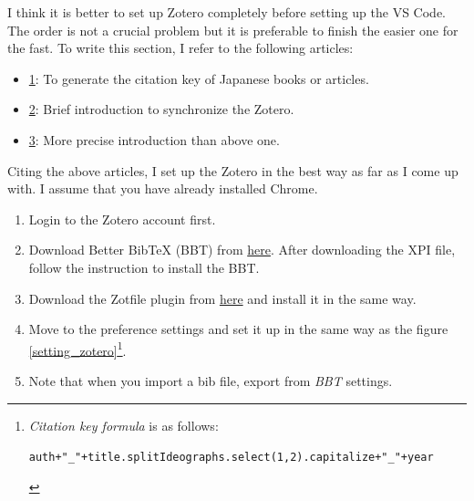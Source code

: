\documentclass[a4paper,pdftex]{article}
\begin{document}
I think it is better to set up Zotero completely before setting up the VS Code. The order is not a crucial problem but it is preferable to finish the easier one for the fast. To write this section, I refer to the following articles:

\begin{itemize}
  \item 
  \href{https://qiita.com/shiro_takeda/items/dfb857e69aa8ed2cc977}{1}: To generate the citation key of Japanese books or articles.

  \item 
  \href{https://qiita.com/Yarakashi_Kikohshi/items/39dfbf3059aaf0690761}{2}: Brief introduction to synchronize the Zotero.

  \item 
  \href{https://necostat.hatenablog.jp/entry/2022/10/09/225731}{3}: More precise introduction than above one.

\end{itemize}

Citing the above articles, I set up the Zotero in the best way as far as I come up with. I assume that you have already installed Chrome.

\begin{enumerate}
  \item 
  Login to the Zotero account first.

  \item 
  Download Better BibTeX (BBT) from \href{https://retorque.re/zotero-better-bibtex/installation/}{here}. After downloading the XPI file, follow the instruction to install the BBT.

  \item 
  Download the Zotfile plugin from \href{https://github.com/jlegewie/zotfile/releases/download/v5.1.2/zotfile-5.1.2-fx.xpi}{here} and install it in the same way.

  \item 
  Move to the preference settings and set it up in the same way as the figure \ref{setting_zotero}\footnote{
    \textit{Citation key formula} is as follows:
    \begin{center}
      \texttt{auth+"\_"+title.splitIdeographs.select(1,2).capitalize+"\_"+year}
    \end{center}
  }.

  \item 
  Note that when you import a bib file, export from \textit{BBT} settings.

\end{enumerate}
\end{document}
